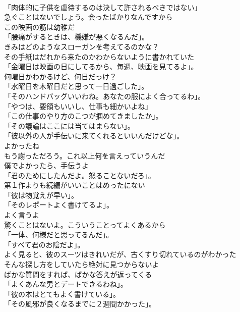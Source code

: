 \documentclass[8pt]{extreport}
\begin{document}
\begin{CJK}{UTF8}{min}
\\	「肉体的に子供を虐待するのは決して許されるべきではない」	
\\	急ぐことはないでしょう。会ったばかりなんですから	
\\	この映画の筋は幼稚だ	
\\	「腰痛がするときは、機嫌が悪くなるんだ」。	
\\	きみはどのようなスローガンを考えてるのかな？	
\\	その手紙はだれから来たのかわからないように書かれていた	
\\	「金曜日は映画の日にしてるから、毎週、映画を見てるよ」。	
\\	何曜日かわかるけど、何日だっけ？	
\\	「水曜日を木曜日だと思って一日過ごした」。	
\\	「そのハンドバッグいいわね。あなたの服によく合ってるわ」。	
\\	「やつは、要領もいいし、仕事も細かいよね」	
\\	「この仕事のやり方のこつが掴めてきましたか」。	
\\	「その議論はここには当てはまらない」。	
\\	「彼以外の人が手伝いに来てくれるといいんだけどな」。	
\\	よかったね	
\\	もう謝っただろう。これ以上何を言えっていうんだ	
\\	僕でよかったら、手伝うよ	
\\	「君のためにしたんだよ。怒ることないだろ」。	
\\	第１作よりも続編がいいことはめったにない	
\\	「彼は物覚えが早い」。	
\\	「そのレポートよく書けてるよ」。	
\\	よく言うよ	
\\	驚くことはないよ。こういうことってよくあるから	
\\	「一体、何様だと思ってるんだ」。	
\\	「すべて君のお陰だよ」。	
\\	よく見ると、彼のスーツはきれいだが、古くすり切れているのがわかった	
\\	そんな探し方をしていたら絶対に見つからないよ	
\\	ばかな質問をすれば、ばかな答えが返ってくる	
\\	「よくあんな男とデートできるわね」。	
\\	「彼の本はとてもよく書けている」。	
\\	「その風邪が良くなるまでに２週間かかった」。	

\end{CJK}
\end{document}
